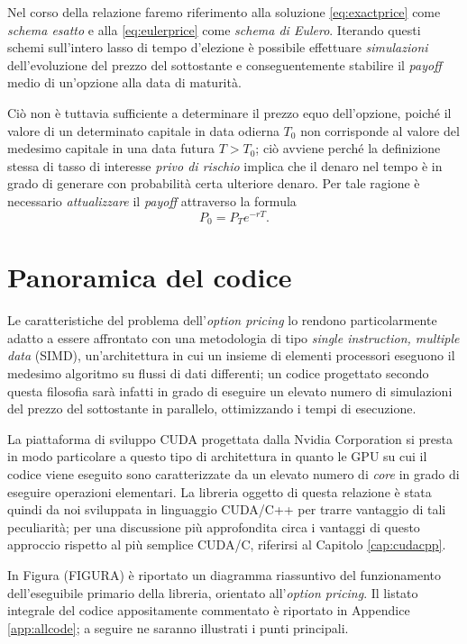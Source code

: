Nel corso della relazione faremo riferimento alla soluzione \eqref{eq:exactprice} come \textit{schema esatto} e alla \eqref{eq:eulerprice} come \textit{schema di Eulero}. Iterando questi schemi sull'intero lasso di tempo d'elezione è possibile effettuare \textit{simulazioni} dell'evoluzione del prezzo del sottostante e conseguentemente stabilire il \textit{payoff} medio di un'opzione alla data di maturità.

Ciò non è tuttavia sufficiente a determinare il prezzo equo dell'opzione, poiché il valore di un determinato capitale in data odierna $T_0$ non corrisponde al valore del medesimo capitale in una data futura $T>T_0$; ciò avviene perché la definizione stessa di tasso di interesse \textit{privo di rischio} implica che il denaro nel tempo è in grado di generare con probabilità certa ulteriore denaro. Per tale ragione è necessario \textit{attualizzare} il \textit{payoff} attraverso la formula
\begin{equation}
    P_0 = P_T e^{-rT}.
    \label{actualization}
\end{equation}


\section{Panoramica del codice} \label{sec:code_generics}
Le caratteristiche del problema dell'\textit{option pricing} lo rendono particolarmente adatto a essere affrontato con una metodologia di tipo \textit{single instruction, multiple data} (SIMD), un'architettura in cui un insieme di elementi processori eseguono il medesimo algoritmo su flussi di dati differenti; un codice progettato secondo questa filosofia sarà infatti in grado di eseguire un elevato numero di simulazioni del prezzo del sottostante in parallelo, ottimizzando i tempi di esecuzione.

La piattaforma di sviluppo CUDA progettata dalla Nvidia Corporation si presta in modo particolare a questo tipo di architettura in quanto le GPU su cui il codice viene eseguito sono caratterizzate da un elevato numero di \textit{core} in grado di eseguire operazioni elementari. La libreria oggetto di questa relazione è stata quindi da noi sviluppata in linguaggio CUDA/C++ per trarre vantaggio di tali peculiarità; per una discussione più approfondita circa i vantaggi di questo approccio rispetto al più semplice CUDA/C, riferirsi al Capitolo \ref{cap:cudacpp}.

In Figura (FIGURA) è riportato un diagramma riassuntivo del funzionamento dell'eseguibile primario della libreria, orientato all'\textit{option pricing}. Il listato integrale del codice appositamente commentato è riportato in Appendice \ref{app:allcode}; a seguire ne saranno illustrati i punti principali.

